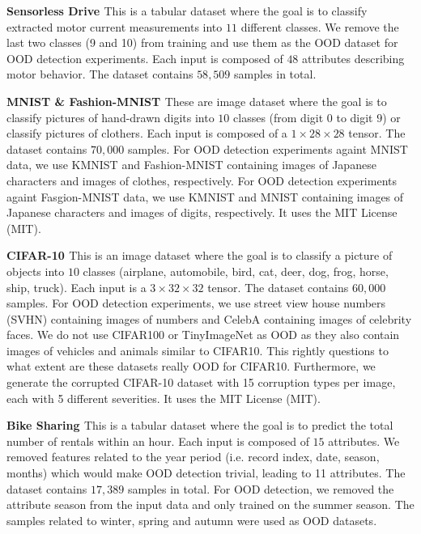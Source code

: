 \textbf{Sensorless Drive \citep{uci_datasets}} This is a tabular dataset where the goal is to classify extracted motor current measurements into $11$ different classes. We remove the last two classes (9 and 10) from training and use them as the OOD dataset for OOD detection experiments. Each input is composed of $48$ attributes describing motor behavior. The dataset contains $58,509$ samples in total.

\textbf{MNIST \citep{mnist} \& Fashion-MNIST \citep{fashionmnist}} These are image dataset where the goal is to classify pictures of hand-drawn digits into $10$ classes (from digit $0$ to digit $9$) or classify pictures of clothers. Each input is composed of a $1 \times 28 \times 28$ tensor. The dataset contains $70,000$ samples. For OOD detection experiments againt MNIST data, we use KMNIST \citep{kmnist} and Fashion-MNIST \citep{fashionmnist} containing images of Japanese characters and images of clothes, respectively. For OOD detection experiments againt Fasgion-MNIST data, we use KMNIST \citep{kmnist} and MNIST \citep{mnist} containing images of Japanese characters and images of digits, respectively. It uses the MIT License (MIT).

\textbf{CIFAR-10 \citep{cifar10}} This is an image dataset where the goal is to classify a picture of objects into $10$ classes (airplane, automobile, bird, cat, deer, dog, frog, horse, ship, truck). Each input is a $3 \times 32 \times 32$ tensor. The dataset contains $60,000$ samples. For OOD detection experiments, we use street view house numbers (SVHN) \citep{svhn} containing images of numbers and CelebA \citep{celeba} containing images of celebrity faces. We do not use CIFAR100 \citep{cifar10} or TinyImageNet \citep{tiny-imagenet} as OOD as they also contain images of vehicles and animals similar to CIFAR10. This rightly questions to what extent are these datasets really OOD for CIFAR10. Furthermore, we generate the corrupted CIFAR-10 dataset \citep{benchmarking-corruptions} with 15 corruption types per image, each with 5 different severities. It uses the MIT License (MIT).

\textbf{Bike Sharing \citep{bike-sharing}} This is a tabular dataset where the goal is to predict the total number of rentals within an hour. Each input is composed of $15$ attributes. We removed features related to the year period (i.e. record index, date, season, months) which would make OOD detection trivial, leading to 11 attributes. The dataset contains $17,389$ samples in total. For OOD detection, we removed the attribute season from the input data and only trained on the summer season. The samples related to winter, spring and autumn were used as OOD datasets.

